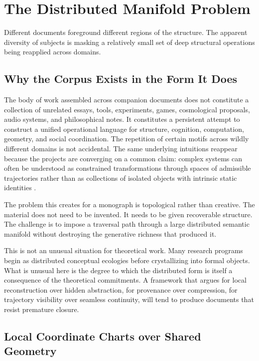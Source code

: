 \chapter{The Distributed Manifold Problem}
\label{ch:manifold}

\epigraph{Different documents foreground different regions of the structure. The apparent
diversity of subjects is masking a relatively small set of deep structural operations being
reapplied across domains.}{}

\section{Why the Corpus Exists in the Form It Does}

The body of work assembled across companion documents does not constitute a collection of
unrelated essays, tools, experiments, games, cosmological proposals, audio systems, and
philosophical notes. It constitutes a persistent attempt to construct a unified operational
language for structure, cognition, computation, geometry, and social coordination. The
repetition of certain motifs across wildly different domains is not accidental. The same
underlying intuitions reappear because the projects are converging on a common claim:
complex systems can often be understood as constrained transformations through spaces of
admissible trajectories rather than as collections of isolated objects with intrinsic static
identities \citep{flyxion2026rsvp, flyxion2026yarncrawler}.

The problem this creates for a monograph is topological rather than creative. The material
does not need to be invented. It needs to be given recoverable structure. The challenge is
to impose a traversal path through a large distributed semantic manifold without destroying
the generative richness that produced it.

This is not an unusual situation for theoretical work. Many research programs begin as
distributed conceptual ecologies before crystallizing into formal objects. What is unusual
here is the degree to which the distributed form is itself a consequence of the theoretical
commitments. A framework that argues for local reconstruction over hidden abstraction,
for provenance over compression, for trajectory visibility over seamless continuity, will
tend to produce documents that resist premature closure.

\section{Local Coordinate Charts over Shared Geometry}

